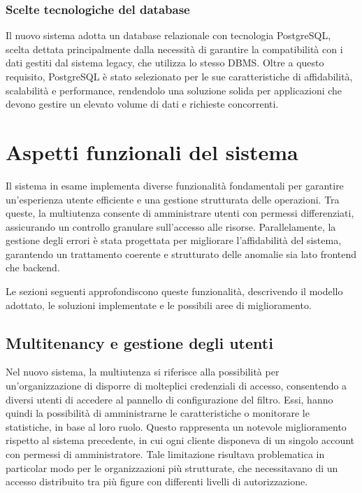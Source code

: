 \subsubsection{Scelte tecnologiche del database}
Il nuovo sistema adotta un database relazionale con tecnologia PostgreSQL, scelta dettata principalmente dalla necessità di garantire la compatibilità con i dati gestiti dal sistema legacy, che utilizza lo stesso DBMS. Oltre a questo requisito, PostgreSQL è stato selezionato per le sue caratteristiche di affidabilità, scalabilità e performance, rendendolo una soluzione solida per applicazioni che devono gestire un elevato volume di dati e richieste concorrenti.

\section{Aspetti funzionali del sistema}
Il sistema in esame implementa diverse funzionalità fondamentali per garantire un'esperienza utente efficiente e una gestione strutturata delle operazioni. Tra queste, la multiutenza consente di amministrare utenti con permessi differenziati, assicurando un controllo granulare sull’accesso alle risorse. Parallelamente, la gestione degli errori è stata progettata per migliorare l'affidabilità del sistema, garantendo un trattamento coerente e strutturato delle anomalie sia lato frontend che backend.

Le sezioni seguenti approfondiscono queste funzionalità, descrivendo il modello adottato, le soluzioni implementate e le possibili aree di miglioramento.

\subsection{Multitenancy e gestione degli utenti}
Nel nuovo sistema, la multiutenza si riferisce alla possibilità per un'organizzazione di disporre di molteplici credenziali di accesso, consentendo a diversi utenti di accedere al pannello di configurazione del filtro. Essi, hanno quindi la possibilità di amministrarne le caratteristiche o monitorare le statistiche, in base al loro ruolo. Questo rappresenta un notevole miglioramento rispetto al sistema precedente, in cui ogni cliente disponeva di un singolo account con permessi di amministratore. Tale limitazione risultava problematica in particolar modo per le organizzazioni più strutturate, che necessitavano di un accesso distribuito tra più figure con differenti livelli di autorizzazione.

